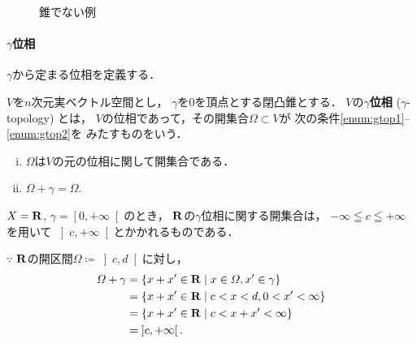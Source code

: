 \begin{figure}[htb]
    \centering
    \caption{錐でない例}
    \label{fig:cone-non-example}
\end{figure}

\paragraph{\(\gamma\)位相}
\(\gamma\)から定まる位相を定義する．

\begin{leftbar}
\begin{DFN}
    \(V\)を\(n\)次元実ベクトル空間とし，
    \(\gamma\)を\(0\)を頂点とする閉凸錐とする．
    \(V\)の\textbf{\(\gamma\)位相} (\(\gamma\)-topology) とは，
    \(V\)の位相であって，その開集合\(\varOmega\subset V\)が
    次の条件\eqref{enum:gtop1}--\eqref{enum:gtop2}を
    みたすものをいう．
    \begin{enumerate}[(i)]
        \item \(\varOmega\)は\(V\)の元の位相に関して開集合である．\label{enum:gtop1}
        \item \(\varOmega+\gamma=\varOmega\).\label{enum:gtop2}
    \end{enumerate}
\end{DFN}
\end{leftbar}

\begin{EG}
    \(X=\mathbf{R}\), \(\gamma=\left[0,+\infty\right[\)のとき，
    \(\mathbf{R}\)の\(\gamma\)位相に関する開集合は，
    \(-\infty\leqq c\leqq+\infty\)を用いて
    \(\left]c,+\infty\right[\)とかかれるものである．
\end{EG}
\begin{redleftbar}
    \(\mathbf{\because}\) \(\mathbf{R}\)の開区間\(
        \varOmega\coloneqq\left]c,d\right[
    \)に対し，
    \begin{align*}
        \varOmega+\gamma 
        &=\left\{x+x'\in\mathbf{R}\mid x\in\varOmega,x'\in\gamma\right\}\\
        &=\left\{x+x'\in\mathbf{R}\mid c<x<d,0<x'<\infty\right\}\\
        &=\left\{x+x'\in\mathbf{R}\mid c<x+x'<\infty\right\}\\
        &=\left]c,+\infty\right[.
    \end{align*}
\end{redleftbar}

